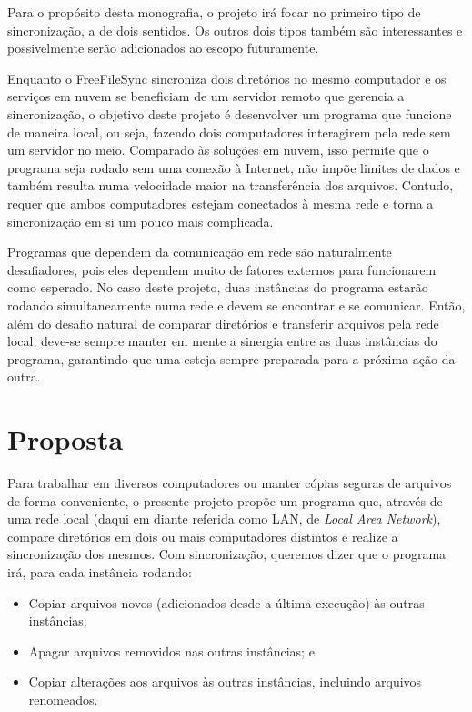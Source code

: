 \documentclass[12pt,a4paper]{ufpr}
\begin{document}
Para o propósito desta monografia, o projeto irá focar no primeiro tipo de sincronização, a de dois sentidos.
Os outros dois tipos também são interessantes e possivelmente serão adicionados ao escopo futuramente.

Enquanto o FreeFileSync sincroniza dois diretórios no mesmo computador e os serviços em nuvem se beneficiam de um servidor remoto que gerencia a sincronização, o objetivo deste projeto é desenvolver um programa que funcione de maneira local, ou seja, fazendo dois computadores interagirem pela rede sem um servidor no meio.
Comparado às soluções em nuvem, isso permite que o programa seja rodado sem uma conexão à Internet, não impõe limites de dados e também resulta numa velocidade maior na transferência dos arquivos.
Contudo, requer que ambos computadores estejam conectados à mesma rede e torna a sincronização em si um pouco mais complicada.

Programas que dependem da comunicação em rede são naturalmente desafiadores, pois eles dependem muito de fatores externos para funcionarem como esperado.
No caso deste projeto, duas instâncias do programa estarão rodando simultaneamente numa rede e devem se encontrar e se comunicar.
Então, além do desafio natural de comparar diretórios e transferir arquivos pela rede local, deve-se sempre manter em mente a sinergia entre as duas instâncias do programa, garantindo que uma esteja sempre preparada para a próxima ação da outra.

\section{Proposta}
Para trabalhar em diversos computadores ou manter cópias seguras de arquivos de forma conveniente, o presente projeto propõe um programa que, através de uma rede local (daqui em diante referida como LAN, de \textit{Local Area Network}), compare diretórios em dois ou mais computadores distintos e realize a sincronização dos mesmos.
Com sincronização, queremos dizer que o programa irá, para cada instância rodando:
\begin{itemize}
    \item Copiar arquivos novos (adicionados desde a última execução) às outras instâncias;
    \item Apagar arquivos removidos nas outras instâncias; e
    \item Copiar alterações aos arquivos às outras instâncias, incluindo arquivos renomeados.
\end{itemize}
\end{document}
